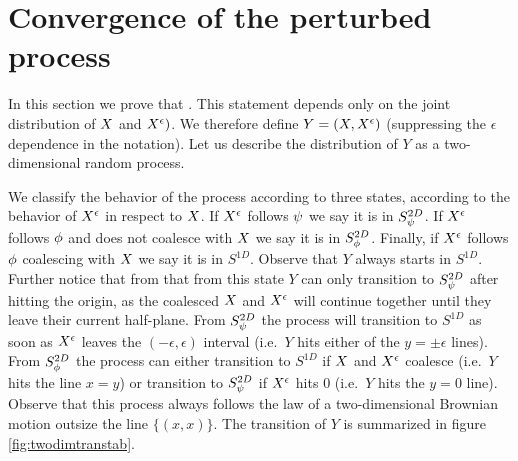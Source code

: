 {
\section{Convergence of the perturbed process}
\label{sec:proof-of-lem:resamplede-to-sampled}

\newcommand{\bandwidth}{\delta}
\newcommand{\union}{\cup}
\renewcommand{\L}{L^+ \union L^-}
\newcommand{\Le}{L^\epsilon}
\newcommand{\statenoweb}{S^{2D}_{\bmweb}}
\newcommand{\statewebapart}{S^{2D}_{\webnoargs}}
\newcommand{\statewebtogether}{S^{1D}}
\newcommand{\twodim}{Y}

In this section we prove that
\statementoflemresampledetosampled{}.  This statement depends only on the
joint distribution of $X$ and $X^{\epsilon})$.
We therefore define $\twodim=(\sampled, \resamplede)$ (suppressing
the $\epsilon$ dependence in the notation). Let us describe the distribution of
$\twodim$
 as a two-dimensional random process.

We classify the behavior of the process according to three states, according to
the behavior of $X^{\epsilon}$ in respect to $X$. If $X^{\epsilon}$ follows
$\psi$ we say it is in $\statenoweb$. If $X^{\epsilon}$ follows $\phi$
and does not coalesce with $X$ we say it is in $\statewebapart$. Finally,
if $X^{\epsilon}$ follows $\phi$ coalescing with $X$ we say it is in
$\statewebtogether$.  Observe that $\twodim$ always starts
in $\statewebtogether$. Further notice that from that from this state $\twodim$
can only transition to $\statenoweb$ after hitting the origin, as the coalesced
$X$ and $X^{\epsilon}$ will continue together until they leave their
current half-plane. From $\statenoweb$ the process will transition to
$\statewebtogether$ as soon as $X^{\epsilon}$ leaves the $(-\epsilon,\epsilon)$
interval (i.e.\ $\twodim$ hits either of the $y=\pm\epsilon$ lines). From
$\statewebapart$ the process can either transition to $\statewebtogether$
if $X$ and $X^{\epsilon}$ coalesce (i.e.\ $\twodim$ hits the line $x=y$)
or transition to $\statenoweb$ if $X^{\epsilon}$ hits $0$ (i.e.\ $\twodim$ hits
the $y=0$ line). Observe that this process always follows the law of a two-dimensional
Brownian motion outsize the line $\{(x,x)\}$. The transition of $\twodim$ is
summarized in figure
\ref{fig:twodimtranstab}.

}
